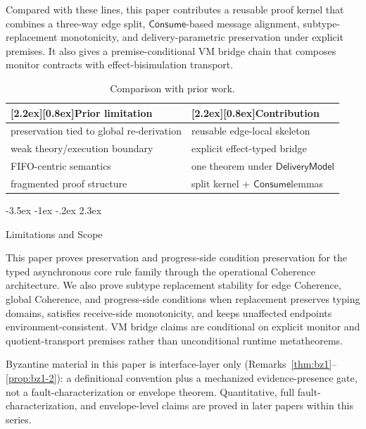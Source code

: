\documentclass[a4paper,10pt,twocolumn,english]{article}
\makeatletter
\renewcommand{\section}{\@startsection{section}{1}{\z@}%
  {-3.5ex \@plus -1ex \@minus -.2ex}%
  {2.3ex}%
  {\raggedright\normalfont\large\bfseries}}
\numberwithin{equation}{section}
\theoremstyle{paperdef}
\theoremstyle{paperplain}
\theoremstyle{paperdef}
\theoremstyle{paperremark}
\newcommand{\thead}[1]{\textbf{\raisebox{0pt}[2.2ex][0.8ex]{#1}}}
\newcommand{\Consume}{\ensuremath{\mathsf{Consume}}}
\newcommand{\DeliveryModel}{\ensuremath{\mathsf{DeliveryModel}}}
\makeatother
\begin{document}
Compared with these lines, this paper contributes a reusable proof kernel that combines a three-way edge split, \Consume{}-based message alignment, subtype-replacement monotonicity, and delivery-parametric preservation under explicit premises. It also gives a premise-conditional VM bridge chain that composes monitor contracts with effect-bisimulation transport.

\begin{table}[H]
	\centering
	\small
	\begin{tabularx}{\columnwidth}{@{}L{0.47\columnwidth}L{0.48\columnwidth}@{}}
		\toprule
		\thead{Prior limitation}                  & \thead{Contribution}             \\
		\midrule
		preservation tied to global re-derivation & reusable edge-local skeleton     \\
		weak theory/execution boundary            & explicit effect-typed bridge     \\
		FIFO-centric semantics                    & one theorem under \DeliveryModel \\
		fragmented proof structure                & split kernel + \Consume lemmas   \\
		\bottomrule
	\end{tabularx}
	\caption{Comparison with prior work.}
\end{table}

\section{Limitations and Scope}
\label{sec:limitations}

This paper proves preservation and progress-side condition preservation for the typed asynchronous core rule family through the
operational Coherence architecture. We also prove subtype replacement stability for edge Coherence,
global Coherence, and progress-side conditions when replacement preserves typing domains, satisfies
receive-side monotonicity, and keeps unaffected endpoints environment-consistent. VM bridge claims are
conditional on explicit monitor and quotient-transport premises rather than unconditional runtime
metatheorems.

Byzantine material in this paper is interface-layer only (Remarks~\ref{thm:bz1}--\ref{prop:bz1-2}): a definitional convention plus a mechanized evidence-presence gate, not a fault-characterization or envelope theorem.
Quantitative, full fault-characterization, and envelope-level claims are proved in later papers within this series.
\end{document}
